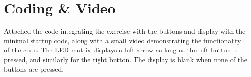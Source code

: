 \section{Coding \& Video}

Attached the code integrating the exercise with the buttons and display with the minimal startup code, along with a small video demonstrating the functionality of the code.
The LED matrix displays a left arrow as long as the left button is pressed, and similarly for the right button.
The display is blank when none of the buttons are pressed.
